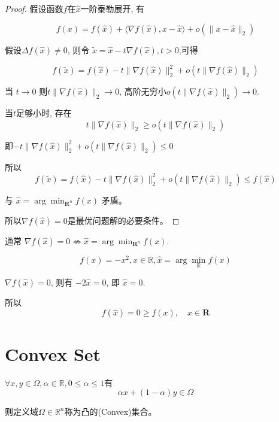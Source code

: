 \begin{proof}
    假设函数$f$在$\hat{x}$一阶泰勒展开, 有

    $$ f(x)=f(\hat{x})+\langle\nabla f(\hat{x}), x-\hat{x}\rangle+o\left(\|x-\hat{x}\|_{2}\right) $$

    假设$ \Delta f(\hat{x}) \neq 0 $, 则令 $ \tilde{x}=\hat{x}-t \nabla f(\hat{x}), t>0 $,可得

    $$ f(\tilde{x})=f(\hat{x})-t\|\nabla f(\hat{x})\|_{2}^{2}+o\left(t\|\nabla f(\hat{x})\|_{2}\right) $$

    当 $ t \rightarrow 0 $ 则$ t\|\nabla f(\hat{x})\|_{2} \rightarrow 0 $,  高阶无穷小$ {o }\left(t\|\nabla f(\hat{x})\|_{2}\right) \rightarrow 0 $.

    当$t$足够小时, 存在$$ t\|\nabla f(\hat{x})\|_{2} \geq o\left(t\|\nabla f(\hat{x})\|_{2}\right) $$
    
    即$ -t\|\nabla f(\hat{x})\|_{2}^{2}+o\left(t\|\nabla f(\hat{x})\|_{2}\right) \leq 0 $

    所以
    $$ f(\tilde{x})=f(\hat{x})-t\|\nabla f(\hat{x})\|_{2}^{2}+o\left(t\|\nabla f(\hat{x})\|_{2}\right) \leq f(\hat{x}) $$
    
    与 $ \hat{x}=\arg \min _{\mathbf{R}^{n}} f(x) $ 矛盾。 

    所以$ \nabla f(\widehat{x})=0 $是最优问题解的必要条件。 
\end{proof}

\begin{remark}
    通常 $ \nabla f(\hat{x})=0 \not \Leftrightarrow \hat{x}=\arg \min _{\mathbf{R}^{n}} f(x) $. 
\end{remark}

\begin{example}
    $$ f(x)=-x^{2},  x \in \mathbb{R}, \hat{x}=\arg \min _{\mathbb{R}} f(x) $$

    $ \nabla f(\hat{x})=0 $, 则有 $ -2 \hat{x}=0 $, 即 $ \hat{x}=0 $.

    所以
    $$ f(\hat{x})=0 \geq f(x), \quad x \in \mathbf{R} $$


\end{example}

\section{Convex Set}

\begin{definition}[凸集]
    $ \forall x, y \in \Omega, \alpha \in \mathbb{R}, 0 \leq \alpha \leq 1 $有
    $$ \alpha x+(1-\alpha) y \in \Omega $$

    则定义域$ \Omega \in \mathbb{R}^{n} $称为凸的(Convex)集合。
\end{definition}


